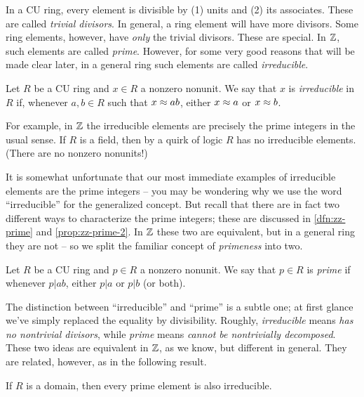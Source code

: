 In a CU ring, every element is divisible by (1) units and (2) its associates.
These are called \emph{trivial divisors}.
In general, a ring element will have more divisors.
Some ring elements, however, have \emph{only} the trivial divisors.
These are special.
In \(\mathbb{Z}\), such elements are called \emph{prime}.
However, for some very good reasons that will be made clear later, in a general ring such elements are called \emph{irreducible}.

\begin{dfn}[Irreducible] \label{dfn:irreducible-element}
Let \(R\) be a CU ring and \(x \in R\) a nonzero nonunit.
We say that \(x\) is \emph{irreducible} in \(R\) if, whenever \(a,b \in R\) such that \(x \approx ab\), either \(x \approx a\) or \(x \approx b\).
\end{dfn}

For example, in \(\mathbb{Z}\) the irreducible elements are precisely the prime integers in the usual sense.
If \(R\) is a field, then by a quirk of logic \(R\) has no irreducible elements.
(There are no nonzero nonunits!)

It is somewhat unfortunate that our most immediate examples of irreducible elements are the prime integers -- you may be wondering why we use the word ``irreducible'' for the generalized concept.
But recall that there are in fact two different ways to characterize the prime integers; these are discussed in \ref{dfn:zz-prime} and \ref{prop:zz-prime-2}.
In \(\mathbb{Z}\) these two are equivalent, but in a general ring they are not -- so we split the familiar concept of \emph{primeness} into two.

\begin{dfn}[Prime] \label{dfn:prime-element}
Let \(R\) be a CU ring and \(p \in R\) a nonzero nonunit.
We say that \(p \in R\) is \emph{prime} if whenever \(p|ab\), either \(p|a\) or \(p|b\) (or both).
\end{dfn}

The distinction between ``irreducible'' and ``prime'' is a subtle one; at first glance we've simply replaced the equality by divisibility.
Roughly, \emph{irreducible} means \emph{has no nontrivial divisors}, while \emph{prime} means \emph{cannot be nontrivially decomposed}.
These two ideas are equivalent in \(\mathbb{Z}\), as we know, but different in general.
They are related, however, as in the following result.

\begin{prop}
If \(R\) is a domain, then every prime element is also irreducible.
\end{prop}

